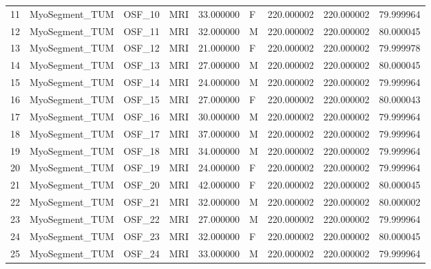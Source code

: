\begin{tabular}{llllrlrrr}
11     &  MyoSegment\_TUM &       OSF\_10 &                MRI &  33.000000 &        F &       220.000002 &    220.000002 &   79.999964 \\
12     &  MyoSegment\_TUM &       OSF\_11 &                MRI &  32.000000 &        M &       220.000002 &    220.000002 &   80.000045 \\
13     &  MyoSegment\_TUM &       OSF\_12 &                MRI &  21.000000 &        F &       220.000002 &    220.000002 &   79.999978 \\
14     &  MyoSegment\_TUM &       OSF\_13 &                MRI &  27.000000 &        M &       220.000002 &    220.000002 &   80.000045 \\
15     &  MyoSegment\_TUM &       OSF\_14 &                MRI &  24.000000 &        M &       220.000002 &    220.000002 &   79.999964 \\
16     &  MyoSegment\_TUM &       OSF\_15 &                MRI &  27.000000 &        F &       220.000002 &    220.000002 &   80.000043 \\
17     &  MyoSegment\_TUM &       OSF\_16 &                MRI &  30.000000 &        M &       220.000002 &    220.000002 &   79.999964 \\
18     &  MyoSegment\_TUM &       OSF\_17 &                MRI &  37.000000 &        M &       220.000002 &    220.000002 &   79.999964 \\
19     &  MyoSegment\_TUM &       OSF\_18 &                MRI &  34.000000 &        M &       220.000002 &    220.000002 &   79.999964 \\
20     &  MyoSegment\_TUM &       OSF\_19 &                MRI &  24.000000 &        F &       220.000002 &    220.000002 &   79.999964 \\
21     &  MyoSegment\_TUM &       OSF\_20 &                MRI &  42.000000 &        F &       220.000002 &    220.000002 &   80.000045 \\
22     &  MyoSegment\_TUM &       OSF\_21 &                MRI &  32.000000 &        M &       220.000002 &    220.000002 &   80.000002 \\
23     &  MyoSegment\_TUM &       OSF\_22 &                MRI &  27.000000 &        M &       220.000002 &    220.000002 &   79.999964 \\
24     &  MyoSegment\_TUM &       OSF\_23 &                MRI &  32.000000 &        F &       220.000002 &    220.000002 &   80.000045 \\
25     &  MyoSegment\_TUM &       OSF\_24 &                MRI &  33.000000 &        M &       220.000002 &    220.000002 &   79.999964 \\

\end{tabular}
